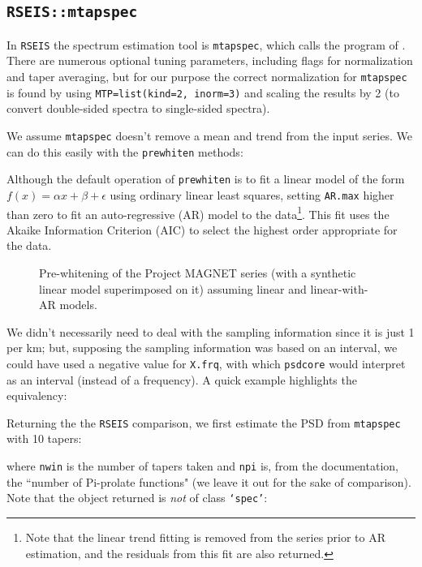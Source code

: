 \documentclass[10pt]{article}\usepackage[]{graphicx}\usepackage[]{color}
\newcommand{\Rcmd}[1]{\texttt{#1}}
\begin{document}
\subsection{\Rcmd{RSEIS::mtapspec}}

In \Rcmd{RSEIS} the spectrum estimation tool is \Rcmd{mtapspec}, which
calls the program of \citet{lees1995}.
There are numerous optional tuning parameters, including
flags for normalization and taper averaging, but 
for our purpose the correct normalization for \Rcmd{mtapspec} is found
by using \Rcmd{MTP=list(kind=2, inorm=3)} and scaling the results by 2 (to convert
double-sided spectra to single-sided spectra).

We assume \Rcmd{mtapspec} doesn't remove a mean and trend from the
input series.  We can do this easily with the \Rcmd{prewhiten} methods:


Although the default operation of  \Rcmd{prewhiten} is to fit a linear model of the form 
$f(x) = \alpha x + \beta + \epsilon$ using ordinary linear least squares,
setting \Rcmd{AR.max} higher than zero to fit an auto-regressive (AR) model to the 
data\footnote{Note that the linear trend fitting is removed from the series prior to AR estimation,
and the residuals from this fit are also returned.}.  
This fit uses the Akaike Information Criterion (AIC) to select
the highest order appropriate for the data.


\label{sxn:prew}

\begin{figure}[!htbp]
\begin{center}

\caption{Pre-whitening of the Project MAGNET series (with a
synthetic linear model superimposed on it) assuming linear and linear-with-AR models.
}
\label{fig:magd}
\end{center}
\end{figure}

\clearpage

We didn't necessarily need to deal with the sampling information since it is just 1 per km;
but, supposing the sampling information was based on an interval, we could have used
a negative value for \Rcmd{X.frq}, with which \Rcmd{psdcore}
would interpret as an interval (instead of a frequency). 
A quick example highlights the equivalency:


Returning the the \Rcmd{RSEIS} comparison, we first 
estimate the PSD from \Rcmd{mtapspec} with 10 tapers:

where \Rcmd{nwin} is the number of tapers taken and
\Rcmd{npi} is, from the documentation, the ``number of Pi-prolate functions" (we
leave it out for the sake of comparison). Note that the object returned
is \emph{not} of class \Rcmd{`spec'}:

\end{document}
